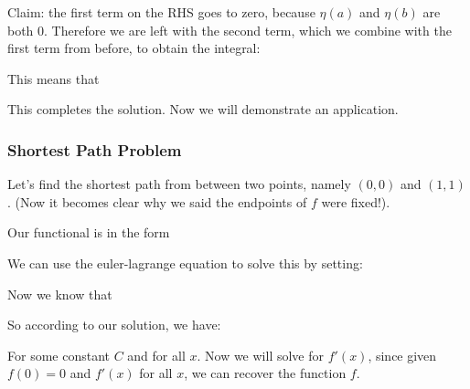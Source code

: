 \documentclass[12pt]{article}
\begin{document}

Claim: the first term on the RHS goes to zero, because $\eta(a)$ and $\eta(b)$ are both 0. Therefore we are left with the second term, which we combine with the first term from before, to obtain the integral:


This means that


This completes the solution. Now we will demonstrate an application.

\subsubsection{Shortest Path Problem}

Let's find the shortest path from between two points, namely $(0,0)$ and $(1,1)$. (Now it becomes clear why we said the endpoints of $f$ were fixed!).

Our functional is in the form


We can use the euler-lagrange equation to solve this by setting:


Now we know that

So according to our solution, we have:

For some constant $C$ and for all $x$. Now we will solve for $f'(x)$, since given $f(0) = 0$ and $f'(x)$ for all $x$, we can recover the function $f$.

\end{document}
